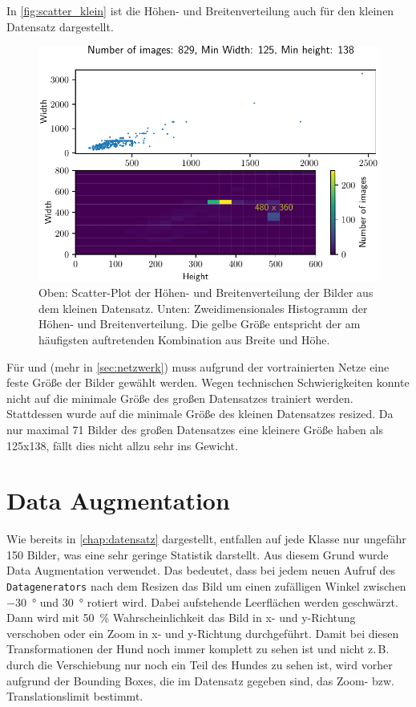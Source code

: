 In \autoref{fig:scatter_klein} ist die Höhen- und Breitenverteilung auch für
den kleinen Datensatz dargestellt.

\begin{figure}
  \centering
  \includegraphics[scale=0.9]{pics/width_height_scatter_hist2d_klein.pdf}
  \caption{Oben: Scatter-Plot der Höhen- und Breitenverteilung der Bilder aus
  dem kleinen Datensatz.
  Unten: Zweidimensionales Histogramm der Höhen- und Breitenverteilung.
  Die gelbe Größe entspricht der am häufigsten auftretenden Kombination
  aus Breite und Höhe.}
  \label{fig:scatter_klein}
\end{figure}

Für \PreDog und \PreBig (mehr in \autoref{sec:netzwerk}) muss aufgrund der
vortrainierten Netze eine feste Größe der Bilder gewählt werden. Wegen
technischen Schwierigkeiten konnte nicht auf die minimale Größe des großen
Datensatzes trainiert  werden. Stattdessen wurde auf die minimale Größe des
kleinen Datensatzes resized. Da nur maximal 71 Bilder des großen Datensatzes
eine kleinere Größe haben als 125x138, fällt dies nicht allzu sehr ins Gewicht.

\section{Data Augmentation}
Wie bereits in \autoref{chap:datensatz} dargestellt, entfallen auf jede Klasse
nur ungefähr 150 Bilder, was eine sehr geringe Statistik darstellt. Aus diesem
Grund wurde Data Augmentation verwendet. Das bedeutet, dass bei jedem neuen
Aufruf des \texttt{Datagenerators} nach dem Resizen das Bild um einen zufälligen
Winkel zwischen \SI{-30}{\degree} und \SI{30}{\degree} rotiert wird. Dabei
aufstehende Leerflächen werden geschwärzt. Dann wird mit \SI{50}{\percent}
Wahrscheinlichkeit das Bild in x- und y-Richtung verschoben oder ein Zoom in x-
und y-Richtung durchgeführt. Damit bei diesen Transformationen der Hund noch
immer komplett zu sehen ist und nicht z.\,B. durch die Verschiebung nur noch ein
Teil des Hundes zu sehen ist, wird vorher aufgrund der Bounding Boxes, die im
Datensatz gegeben sind, das Zoom- bzw. Translationslimit bestimmt.

